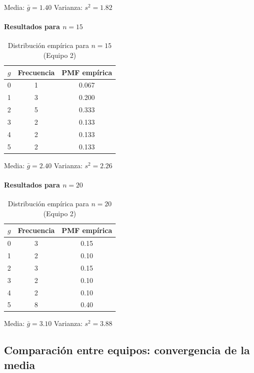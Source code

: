 Media: \(\bar{g}=1.40\) \quad Varianza: \(s^2=1.82\)

\paragraph{\texorpdfstring{Resultados para \(n=15\)}{Resultados para n=15}}

\begin{table}[H]
\centering
\begin{tabular}{ccc}
\toprule
\(g\) & Frecuencia & PMF empírica \\
\midrule
0 & 1 & 0.067 \\
1 & 3 & 0.200 \\
2 & 5 & 0.333 \\
3 & 2 & 0.133 \\
4 & 2 & 0.133 \\
5 & 2 & 0.133 \\
\bottomrule
\end{tabular}
\caption{Distribución empírica para \(n=15\) (Equipo 2)}
\end{table}

Media: \(\bar{g}=2.40\) \quad Varianza: \(s^2=2.26\)

\paragraph{\texorpdfstring{Resultados para \(n=20\)}{Resultados para n=20}}

\begin{table}[H]
\centering
\begin{tabular}{ccc}
\toprule
\(g\) & Frecuencia & PMF empírica \\
\midrule
0 & 3 & 0.15 \\
1 & 2 & 0.10 \\
2 & 3 & 0.15 \\
3 & 2 & 0.10 \\
4 & 2 & 0.10 \\
5 & 8 & 0.40 \\
\bottomrule
\end{tabular}
\caption{Distribución empírica para \(n=20\) (Equipo 2)}
\end{table}

Media: \(\bar{g}=3.10\) \quad Varianza: \(s^2=3.88\)

\subsection{Comparación entre equipos: convergencia de la media}

